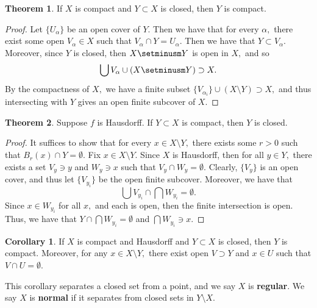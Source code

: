 \documentclass[10pt, oneside]{article}
\theoremstyle{definition}
\newtheorem{thm}{Theorem}
\newtheorem{cor}{Corollary}
\begin{document}
\begin{thm}
    If $X$ is compact and $Y\subset X$ is closed, then $Y$ is compact.
\end{thm}
\begin{proof}
    Let $\{U_\alpha\}$ be an open cover of $Y.$ Then we have that for every $\alpha,$ there exist some open $V_\alpha \in X$ such that $V_\alpha \cap Y = U_\alpha.$ Then we have that $Y \subset V_\alpha.$ Moreover, since $Y$ is closed, then $X\setminusm Y$ is open in $X,$ and so 
    \[\bigcup V_\alpha \cup (X\setminusm Y) \supset X.\] By the compactness of $X,$ we have a finite subset $\{V_{\alpha_i}\}\cup (X\setminus Y) \supset X,$ and thus intersecting with $Y$ gives an open finite subcover of $X.$
\end{proof}

\begin{thm}
    Suppose $f$ is Hausdorff. If $Y\subset X$ is compact, then $Y$ is closed.
\end{thm}
\begin{proof}
    It suffices to show that for every $x\in X\setminus Y,$ there exists some $r>0$ such that $B_r(x) \cap Y = \emptyset.$ Fix $x\in X \setminus Y.$ Since $X$ is Hausdorff, then for all $y\in Y,$ there exists a set $V_y\ni y$ and $W_y \ni x$ such that $V_y \cap W_y = \emptyset.$ Clearly, $\{V_y\}$ is an open cover, and thus let $\{V_{y_i}\}$ be the open finite subcover. Moreover, we have that 
    \[\bigcup V_{y_i} \cap \bigcap W_{y_i} = \emptyset.\] Since $x\in W_{y_i}$ for all $x,$ and each is open, then the finite intersection is open. Thus, we have that $Y \cap \bigcap W_{y_i} = \emptyset$ and $\bigcap W_{y_i} \ni x.$
\end{proof}
\begin{cor}
    If $X$ is compact and Hausdorff and $Y\subset X$ is closed, then $Y$ is compact. Moreover, for any $x\in X\setminus Y,$ there exist open $V \supset Y$ and $x\in U$ such that $V\cap U = \emptyset.$
\end{cor}
This corollary separates a closed set from a point, and we say $X$ is \textbf{regular}. We say $X$ is \textbf{normal} if it separates from closed sets in $Y \setminus X.$
\end{document}
